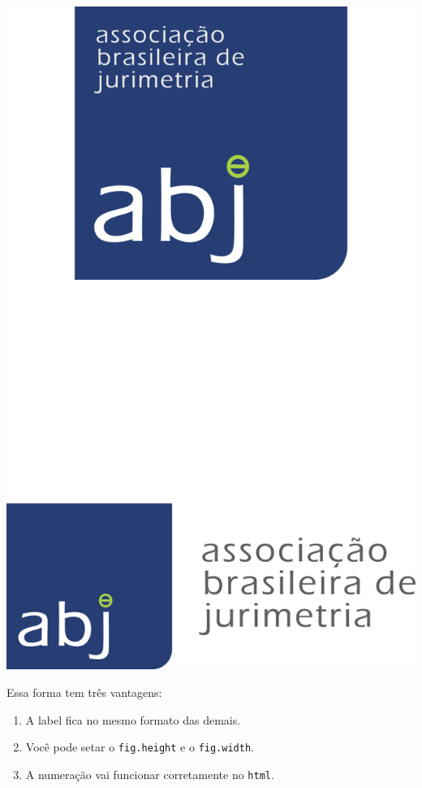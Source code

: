 \documentclass[12pt,]{report}
\providecommand{\tightlist}{%
  \setlength{\itemsep}{0pt}\setlength{\parskip}{0pt}}
\let\origfigure\figure
\let\endorigfigure\endfigure
\renewenvironment{figure}[1][2] {
    \expandafter\origfigure\expandafter[H]
} {
    \endorigfigure
}
\begin{document}
\begin{figure}

{\centering \includegraphics{imgs/logo_abj} 

}

\caption{The RStudio addin to help input LaTeX math.}\label{fig:mathquill}
\end{figure}

Essa forma tem três vantagens:

\begin{enumerate}
\def\labelenumi{\arabic{enumi}.}
\tightlist
\item
  A label fica no mesmo formato das demais.
\item
  Você pode setar o \texttt{fig.height} e o \texttt{fig.width}.
\item
  A numeração vai funcionar corretamente no \texttt{html}.
\end{enumerate}
\end{document}
